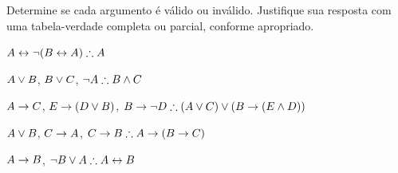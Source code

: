 \noindent\problempart Determine se cada argumento é válido ou inválido. Justifique sua resposta com uma tabela-verdade completa ou parcial, conforme apropriado.
\label{pr.TT.valid6} 
\begin{compactlist}
\item $A\eiff\enot(B\eiff A)\therefore A$ %
\item $A\vee B$, $B\vee C$, $\enot A\therefore B \eand C$ %
\item $A \rightarrow C$, $E \rightarrow (D \vee B)$, $B \eif \enot D\therefore (A \eor C) \eor (B \eif (E \eand D))$ %
\item $A \vee B$, $C \rightarrow A$, $C \eif B\therefore A \eif (B \eif C)$ %
\item $A \rightarrow B$, $\enot B \eor A\therefore A \eiff B$ %
\end{compactlist}
